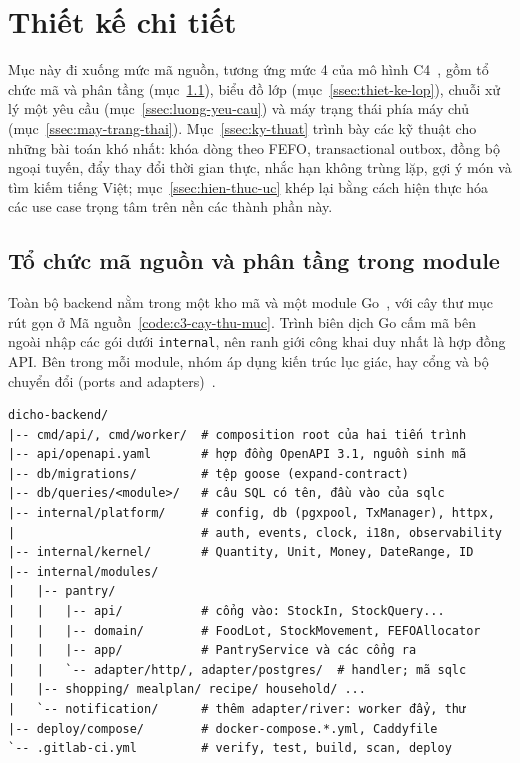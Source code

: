 \section{Thiết kế chi tiết}\label{sec:thiet-ke-chi-tiet}

Mục này đi xuống mức mã nguồn, tương ứng mức 4 của mô hình C4~\cite{c4model}, gồm tổ chức mã và phân tầng (mục~\ref{ssec:to-chuc-ma-nguon}), biểu đồ lớp (mục~\ref{ssec:thiet-ke-lop}), chuỗi xử lý một yêu cầu (mục~\ref{ssec:luong-yeu-cau}) và máy trạng thái phía máy chủ (mục~\ref{ssec:may-trang-thai}). Mục~\ref{ssec:ky-thuat} trình bày các kỹ thuật cho những bài toán khó nhất: khóa dòng theo FEFO, transactional outbox, đồng bộ ngoại tuyến, đẩy thay đổi thời gian thực, nhắc hạn không trùng lặp, gợi ý món và tìm kiếm tiếng Việt; mục~\ref{ssec:hien-thuc-uc} khép lại bằng cách hiện thực hóa các use case trọng tâm trên nền các thành phần này.

\subsection{Tổ chức mã nguồn và phân tầng trong module}\label{ssec:to-chuc-ma-nguon}

Toàn bộ backend nằm trong một kho mã và một module Go~\cite{golang}, với cây thư mục rút gọn ở Mã nguồn~\ref{code:c3-cay-thu-muc}. Trình biên dịch Go cấm mã bên ngoài nhập các gói dưới \texttt{internal}, nên ranh giới công khai duy nhất là hợp đồng API. Bên trong mỗi module, nhóm áp dụng kiến trúc lục giác, hay cổng và bộ chuyển đổi (ports and adapters)~\cite{hexagonal}.

\begin{Verbatim}
dicho-backend/
|-- cmd/api/, cmd/worker/  # composition root của hai tiến trình
|-- api/openapi.yaml       # hợp đồng OpenAPI 3.1, nguồn sinh mã
|-- db/migrations/         # tệp goose (expand-contract)
|-- db/queries/<module>/   # câu SQL có tên, đầu vào của sqlc
|-- internal/platform/     # config, db (pgxpool, TxManager), httpx,
|                          # auth, events, clock, i18n, observability
|-- internal/kernel/       # Quantity, Unit, Money, DateRange, ID
|-- internal/modules/
|   |-- pantry/
|   |   |-- api/           # cổng vào: StockIn, StockQuery...
|   |   |-- domain/        # FoodLot, StockMovement, FEFOAllocator
|   |   |-- app/           # PantryService và các cổng ra
|   |   `-- adapter/http/, adapter/postgres/  # handler; mã sqlc
|   |-- shopping/ mealplan/ recipe/ household/ ...
|   `-- notification/      # thêm adapter/river: worker đẩy, thư
|-- deploy/compose/        # docker-compose.*.yml, Caddyfile
`-- .gitlab-ci.yml         # verify, test, build, scan, deploy
\end{Verbatim}

